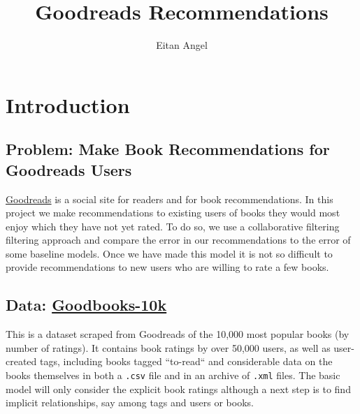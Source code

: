 \documentclass[11pt]{article}
\title{Goodreads Recommendations}
\author{Eitan Angel}
\begin{document}
    	
    
    \maketitle
 
\tableofcontents

\listoffigures 

\listoftables
 
 \newpage
 
     \hypertarget{introduction}{%
\section{Introduction}\label{introduction}}


    \hypertarget{problem}{%
\subsection{Problem: Make Book Recommendations for Goodreads Users}\label{problem}}

\href{https://www.goodreads.com}{Goodreads} is a social site for readers and for book recommendations. In this project we make recommendations to existing users of books they would most enjoy which they have not yet rated. To do so, we use a collaborative filtering filtering approach and compare the error in our recommendations to the error of some baseline models. Once we have made this model it is not so difficult to provide recommendations to new users who are willing to rate a few books. 


    \hypertarget{data}{%
\subsection{Data: \href{https://github.com/zygmuntz/goodbooks-10k}{Goodbooks-10k}}\label{data}}

This is a dataset scraped from Goodreads of the 10,000 most popular books (by number of ratings). It contains book ratings by over 50,000 users, as well as user-created tags, including books tagged ``to-read`` and considerable data on the books themselves in both a \texttt{.csv} file and in an archive of \texttt{.xml} files. The basic model will only consider the explicit book ratings although a next step is to find implicit relationships, say among tags and users or books.
    
\end{document}
